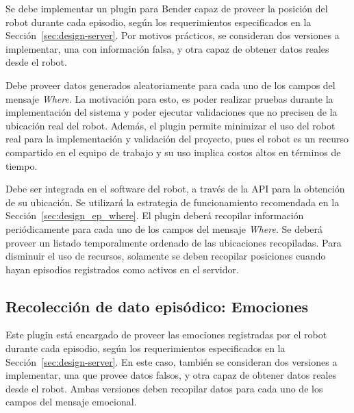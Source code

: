 Se debe implementar un plugin para Bender capaz de proveer la posición del robot durante cada episodio, según los requerimientos especificados en la Sección~\ref{sec:design-server}. Por motivos prácticos, se consideran dos versiones a implementar, una con información falsa, y otra capaz de obtener datos reales desde el robot.

Debe proveer datos generados aleatoriamente para cada uno de los campos del mensaje \textit{Where}. La motivación para esto, es poder realizar pruebas durante la implementación del sistema y poder ejecutar validaciones que no precisen de la ubicación real del robot. Además, el plugin permite minimizar el uso del robot real para la implementación y validación del proyecto, pues el robot es un recurso compartido en el equipo de trabajo y su uso implica costos altos en términos de tiempo.

Debe ser integrada en el software del robot, a través de la API para la obtención de su ubicación. Se utilizará la estrategia de funcionamiento recomendada en la Sección~\ref{sec:design_ep_where}. El plugin deberá recopilar información periódicamente para cada uno de los campos del mensaje \textit{Where}. Se deberá proveer un listado temporalmente ordenado de las ubicaciones recopiladas. Para disminuir el uso de recursos, solamente se deben recopilar posiciones cuando hayan episodios registrados como activos en el servidor.


\subsection{Recolección de dato episódico: Emociones}

Este plugin está encargado de proveer las emociones registradas por el robot durante cada episodio, según los requerimientos especificados en la Sección~\ref{sec:design-server}. En este caso, también se consideran dos versiones a implementar, una que provee datos falsos, y otra capaz de obtener datos reales desde el robot. Ambas versiones deben recopilar datos para cada uno de los campos del mensaje emocional.

